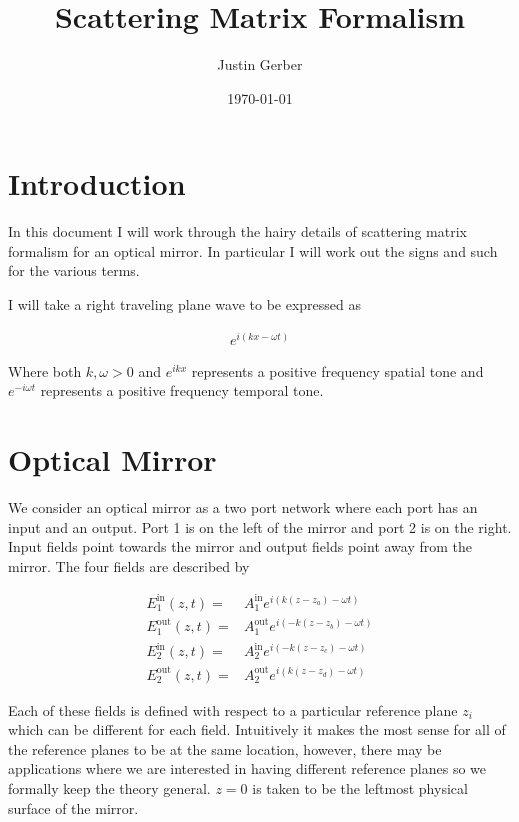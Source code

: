 \documentclass[12pt]{article}
\begin{document}
\title{Scattering Matrix Formalism}
\author{Justin Gerber}
\date{\today}
\maketitle

\section{Introduction}
In this document I will work through the hairy details of scattering matrix formalism for an optical mirror.
In particular I will work out the signs and such for the various terms.

I will take a right traveling plane wave to be expressed as

\begin{align}
e^{i(kx-\omega t)}
\end{align}

Where both $k,\omega >0$ and $e^{ikx}$ represents a positive frequency spatial tone and $e^{-i\omega t}$ represents a positive frequency temporal tone.

\section{Optical Mirror}

We consider an optical mirror as a two port network where each port has an input and an output.
Port 1 is on the left of the mirror and port 2 is on the right.
Input fields point towards the mirror and output fields point away from the mirror.
The four fields are described by

\begin{align}
E_1^{\text{in}}(z,t) =& A_{1}^{\text{in}} e^{i(k(z-z_a)-\omega t)}\\
E_1^{\text{out}}(z,t) =& A_{1}^{\text{out}} e^{i(-k(z-z_b)-\omega t)}\\
E_2^{\text{in}}(z,t) =& A_{2}^{\text{in}} e^{i(-k(z-z_c)-\omega t)}\\
E_2^{\text{out}}(z,t) =& A_{2}^{\text{out}} e^{i(k(z-z_d)-\omega t)}
\end{align}

Each of these fields is defined with respect to a particular reference plane $z_i$ which can be different for each field.
Intuitively it makes the most sense for all of the reference planes to be at the same location, however, there may be applications where we are interested in having different reference planes so we formally keep the theory general.
$z=0$ is taken to be the leftmost physical surface of the mirror.
\end{document}
